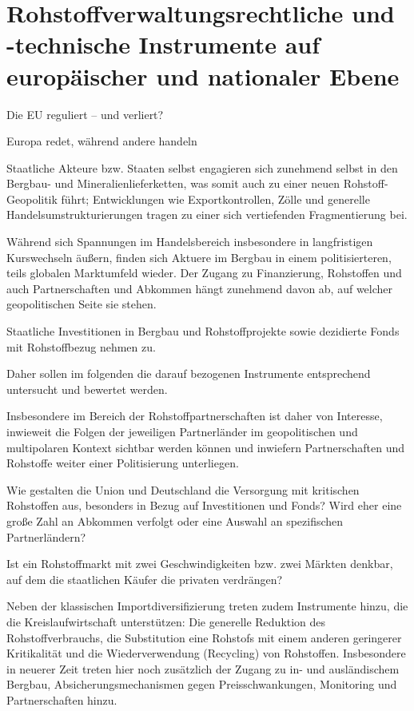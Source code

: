 \documentclass[12pt,a4paper,oneside]{book} %
\begin{document}

\chapter{Rohstoffverwaltungsrechtliche und -technische Instrumente auf europäischer und nationaler Ebene}

\glqq Die EU reguliert -- und verliert?\grqq 

\glqq Europa redet, während andere handeln\grqq 

Staatliche Akteure bzw. Staaten selbst engagieren sich zunehmend selbst in den Bergbau- und Mineralienlieferketten, was somit auch zu einer neuen Rohstoff-Geopolitik führt; Entwicklungen wie Exportkontrollen, Zölle und generelle Handelsumstrukturierungen tragen zu einer sich vertiefenden Fragmentierung bei.

Während sich Spannungen im Handelsbereich insbesondere in langfristigen Kurswechseln äußern, finden sich Aktuere im Bergbau in einem politisierteren, teils globalen Marktumfeld wieder. Der Zugang zu Finanzierung, Rohstoffen und auch Partnerschaften und Abkommen hängt zunehmend davon ab, auf welcher geopolitischen Seite sie stehen.

Staatliche Investitionen in Bergbau und Rohstoffprojekte sowie dezidierte Fonds mit Rohstoffbezug nehmen zu.

Daher sollen im folgenden die darauf bezogenen Instrumente entsprechend untersucht und bewertet werden.

Insbesondere im Bereich der Rohstoffpartnerschaften ist daher von Interesse, inwieweit die Folgen der jeweiligen Partnerländer im geopolitischen und multipolaren Kontext sichtbar werden können und inwiefern Partnerschaften und Rohstoffe weiter einer Politisierung unterliegen.

Wie gestalten die Union und Deutschland die Versorgung mit kritischen Rohstoffen aus, besonders in Bezug auf Investitionen und Fonds? Wird eher eine große Zahl an Abkommen verfolgt oder eine Auswahl an spezifischen Partnerländern?

Ist ein Rohstoffmarkt mit zwei Geschwindigkeiten bzw. zwei Märkten denkbar, auf dem die staatlichen Käufer die privaten verdrängen?

Neben der klassischen Importdiversifizierung treten zudem Instrumente hinzu, die die Kreislaufwirtschaft unterstützen: Die generelle Reduktion des Rohstoffverbrauchs, die Substitution eine Rohstofs mit einem anderen geringerer Kritikalität und die Wiederverwendung (Recycling) von Rohstoffen.\autocite{Frenz 2025, S. 758} Insbesondere in neuerer Zeit treten hier noch zusätzlich der Zugang zu in- und ausländischem Bergbau, Absicherungsmechanismen gegen Preisschwankungen, Monitoring und Partnerschaften hinzu.\autocite{Frenz 2025, S. 758.759}
\end{document}
